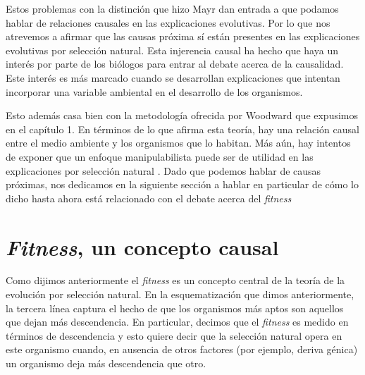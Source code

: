 Estos problemas con la distinción que hizo Mayr dan entrada a que podamos hablar de relaciones causales en las explicaciones evolutivas. Por lo que nos atrevemos a afirmar que las causas próxima sí están presentes en las explicaciones evolutivas por selección natural. Esta injerencia causal ha hecho que haya un interés por parte de los biólogos para entrar al debate acerca de la causalidad. Este interés es más marcado cuando se desarrollan explicaciones que intentan incorporar una variable ambiental en el desarrollo de los organismos.

Esto además casa bien con la metodología ofrecida por Woodward que expusimos en el capítulo 1. En términos de lo que afirma esta teoría, hay una relación causal entre el medio ambiente y los organismos que lo habitan. Más aún, hay intentos de exponer que un enfoque manipulabilista puede ser de utilidad en las explicaciones por selección natural \cite{MacColl2011}. Dado que podemos hablar de causas próximas, nos dedicamos en la siguiente sección a hablar en particular de cómo lo dicho hasta ahora está relacionado con el debate acerca del \emph{fitness}

\section{\emph{Fitness}, un concepto causal}

\noindent Como dijimos anteriormente el \emph{fitness} es un concepto central de la teoría de la evolución por selección natural. En la esquematización que dimos anteriormente, la tercera línea captura el hecho de que los organismos más aptos son aquellos que dejan más descendencia. En particular, decimos que el \emph{fitness} es medido en términos de descendencia y esto quiere decir que la selección natural opera en este organismo cuando, en ausencia de otros factores (por ejemplo, deriva génica) un organismo deja más descendencia que otro.


